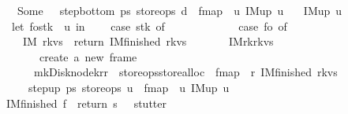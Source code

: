 \begin{isabellebody}
\ \ \ \ {\isacharbar}\ Some\ {\isacharunderscore}\ {\isasymRightarrow}\ step{\isacharunderscore}bottom\ ps{}\ store{\isacharunderscore}ops\ d\ {\isacharbar}{\isachargreater}\ fmap\ {\isacharparenleft}{\isacharpercent}\ u{\isachardot}\ IM{\isacharunderscore}up\ u{\isacharparenright}{\isacharparenright}\isanewline
\ \ {\isacharbar}\ IM{\isacharunderscore}up\ u\ {\isasymRightarrow}\ {\isacharparenleft}\isanewline
\ \ \ \ let\ {\isacharparenleft}fo{\isacharcomma}stk{\isacharparenright}\ {\isacharequal}\ u\ in\isanewline
\ \ \ \ case\ stk\ of\isanewline
\ \ \ \ {\isacharbrackleft}{\isacharbrackright}\ {\isasymRightarrow}\ {\isacharparenleft}\isanewline
\ \ \ \ \ \ case\ fo\ of\ \isanewline
\ \ \ \ \ \ IM{}\ {\isacharparenleft}r{\isacharcomma}kvs{}{\isacharparenright}\ {\isasymRightarrow}\ return\ {\isacharparenleft}IM{\isacharunderscore}finished\ {\isacharparenleft}r{\isacharcomma}kvs{}{\isacharparenright}{\isacharparenright}\isanewline
\ \ \ \ \ \ {\isacharbar}\ IM{}{\isacharparenleft}{\isacharparenleft}r{}{\isacharcomma}k{\isacharcomma}r{}{\isacharparenright}{\isacharcomma}kvs{}{\isacharparenright}\ {\isasymRightarrow}\ {\isacharparenleft}\isanewline
\ \ \ \ \ \ \ \ {\isacharparenleft}{\isacharasterisk}\ create\ a\ new\ frame\ {\isacharasterisk}{\isacharparenright}\isanewline
\ \ \ \ \ \ \ \ {\isacharparenleft}mk{\isacharunderscore}Disk{\isacharunderscore}node{\isacharparenleft}{\isacharbrackleft}k{\isacharbrackright}{\isacharcomma}{\isacharbrackleft}r{}{\isacharcomma}r{}{\isacharbrackright}{\isacharparenright}\ {\isacharbar}{\isachargreater}\ {\isacharparenleft}store{\isacharunderscore}ops{\isacharbar}{\isachargreater}store{\isacharunderscore}alloc{\isacharparenright}\ {\isacharbar}{\isachargreater}\ fmap\ {\isacharparenleft}{\isacharpercent}\ r{\isachardot}\ IM{\isacharunderscore}finished\ {\isacharparenleft}r{\isacharcomma}kvs{}{\isacharparenright}{\isacharparenright}{\isacharparenright}{\isacharparenright}{\isacharparenright}\isanewline
\ \ \ \ {\isacharbar}\ {\isacharunderscore}\ {\isasymRightarrow}\ {\isacharparenleft}step{\isacharunderscore}up\ ps{}\ store{\isacharunderscore}ops\ u\ {\isacharbar}{\isachargreater}\ fmap\ {\isacharparenleft}{\isacharpercent}\ u{\isachardot}\ IM{\isacharunderscore}up\ u{\isacharparenright}{\isacharparenright}{\isacharparenright}\isanewline
\ \ {\isacharbar}\ IM{\isacharunderscore}finished\ f\ {\isasymRightarrow}\ {\isacharparenleft}return\ s{\isacharparenright}\ \ {\isacharparenleft}{\isacharasterisk}\ stutter\ {\isacharasterisk}{\isacharparenright}\isanewline
{\isacharparenright}{\isachardoublequoteclose}\isanewline
%
\isadelimtheory
\isanewline
%
\endisadelimtheory
%
\isatagtheory
{}\isamarkupfalse%
%
\endisatagtheory
{\isafoldtheory}%
%
\isadelimtheory
%
\endisadelimtheory
\end{isabellebody}%
